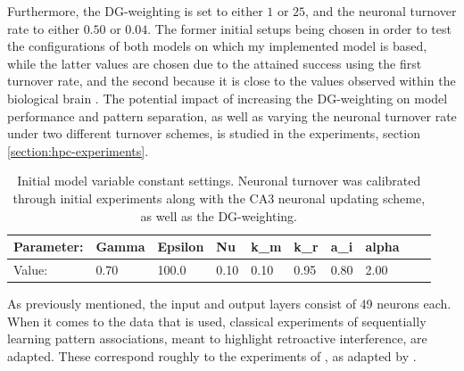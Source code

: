 Furthermore, the DG-weighting is set to either $1$ or $25$, and the neuronal turnover rate to either $0.50$ or $0.04$. The former initial setups being chosen in order to test the configurations of both models on which my implemented model is based, while the latter values are chosen due to the attained success using the first turnover rate, and the second because it is close to the values observed within the biological brain \citep{Rolls1998chpt6}.
The potential impact of increasing the DG-weighting on model performance and pattern separation, as well as varying the neuronal turnover rate under two different turnover schemes, is studied in the experiments, section \ref{section:hpc-experiments}.

\begin{table}
\centering
\caption{Initial model variable constant settings. Neuronal turnover was calibrated through initial experiments along with the CA3 neuronal updating scheme, as well as the DG-weighting.}
\label{table:initial_settings}
\begin{tabular}{|l|l|l|l|l|l|l|l|l|l|}
\cline{1-8}
Parameter: & Gamma & Epsilon & Nu   & k\_m & k\_r & a\_i & alpha \\ \hline
Value:     & 0.70  & 100.0   & 0.10 & 0.10 & 0.95 & 0.80 & 2.00 \\ \hline
\end{tabular}
\end{table}

As previously mentioned, the input and output layers consist of 49 neurons each. 
When it comes to the data that is used, classical experiments of sequentially learning pattern associations, meant to highlight retroactive interference, are adapted. These correspond roughly to the experiments of \citep{McCloskey1989}, as adapted by \citep{French1997, Hattori2010, Hattori2014}.

